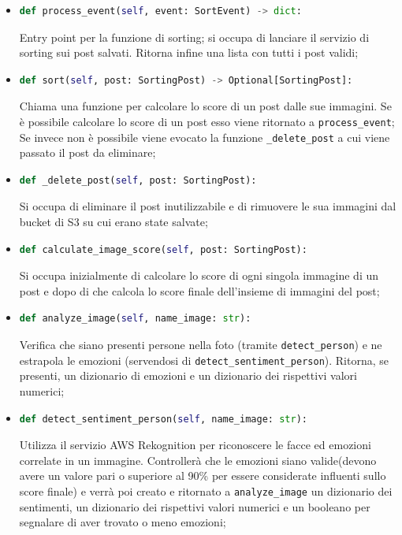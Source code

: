\begin{itemize}
	\item 
	\begin{lstlisting}[language=Python, numbers=none]
def process_event(self, event: SortEvent) -> dict:
	\end{lstlisting}
Entry point per la funzione di sorting; si occupa di lanciare il servizio di sorting sui post salvati. Ritorna infine una lista con tutti i post validi;
	\item 
	\begin{lstlisting}[language=Python, numbers=none]
def sort(self, post: SortingPost) -> Optional[SortingPost]:
	\end{lstlisting}
Chiama una funzione per calcolare lo score di un post dalle sue immagini. Se è possibile calcolare lo score di un post esso viene ritornato a \verb+process_event+; Se invece non è possibile viene evocato la funzione \verb+_delete_post+ a cui viene passato il post da eliminare;
	\item 
	\begin{lstlisting}[language=Python, numbers=none]
def _delete_post(self, post: SortingPost):
	\end{lstlisting}		
Si occupa di eliminare il post inutilizzabile e di rimuovere le sua immagini dal bucket di S3 su cui erano state salvate;
	\item 
	\begin{lstlisting}[language=Python, numbers=none]
def calculate_image_score(self, post: SortingPost):
	\end{lstlisting}	
Si occupa inizialmente di calcolare lo score di ogni singola immagine di un post e dopo di che calcola lo score finale dell'insieme di immagini del post;
	\item
	\begin{lstlisting}[language=Python, numbers=none]
def analyze_image(self, name_image: str):
	\end{lstlisting}	
Verifica che siano presenti persone nella foto (tramite \verb+detect_person+) e ne estrapola le emozioni (servendosi di \verb+detect_sentiment_person+). Ritorna, se presenti, un dizionario di emozioni e un dizionario dei rispettivi valori numerici;
	\item 
	\begin{lstlisting}[language=Python, numbers=none]
def detect_sentiment_person(self, name_image: str):
	\end{lstlisting}	
Utilizza il servizio AWS Rekognition per riconoscere le facce ed emozioni correlate in un immagine. Controllerà che le emozioni siano valide(devono avere un valore pari o superiore al 90\% per essere considerate influenti sullo score finale) e verrà poi creato e ritornato a \verb+analyze_image+ un dizionario dei sentimenti, un dizionario dei rispettivi valori numerici e un booleano per segnalare di aver trovato o meno emozioni;

\end{itemize}
